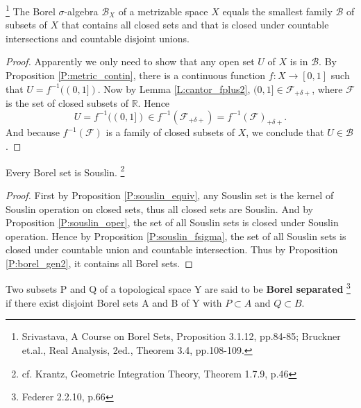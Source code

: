 \begin{proposition} \label{P:borel_gen4}
\footnote{Srivastava, A Course on Borel Sets, Proposition 3.1.12, pp.84-85;
	Bruckner et.al., Real Analysis, 2ed., Theorem 3.4, pp.108-109.}
The Borel $\sigma$-algebra $\mathcal{B}_X$ of a metrizable space $X$ equals the
smallest family $\mathcal{B}$ of subsets of $X$ that contains all closed sets and
that is closed under countable intersections and countable disjoint unions.
\end{proposition}
\begin{proof}
Apparently we only need to show that any open set $U$ of $X$ is in 
$\mathcal{B}$. By Proposition \ref{P:metric_contin}, there is a continuous
function $f:X\to [0,1]$ such that $U=f^{-1}((0,1])$. Now by Lemma
\ref{L:cantor_fplus2}, $(0,1]\in\mathcal{F}_{+\delta +}$, where $\mathcal{F}$ is
the set of closed subsets of $\mathbb{R}$. Hence
\[
  U=f^{-1}((0,1]) \in f^{-1}(\mathcal{F}_{+\delta +})
   = f^{-1}(\mathcal{F})_{+\delta +}. 
\]
And because $f^{-1}(\mathcal{F})$ is a family of closed subsets of $X$, we
conclude that $U \in \mathcal{B}$.
\end{proof}


\begin{proposition}
Every Borel set is Souslin.
  \footnote{cf. Krantz, Geometric Integration Theory, Theorem 1.7.9, p.46}
\end{proposition}
\begin{proof}
First by Proposition \ref{P:souslin_equiv}, any Souslin set is the kernel of
Souslin operation on closed sets, thus all closed sets are Souslin. And by
Proposition \ref{P:souslin_oper}, the set of all Souslin sets is closed under 
Souslin operation. Hence by Proposition \ref{P:souslin_fsigma}, the set of all
Souslin sets is closed under countable union and countable intersection. Thus by
Proposition \ref{P:borel_gen2}, it contains all Borel sets.
\end{proof}

\begin{definition}
Two subsets P and Q of a topological space Y are said to be 
\textbf{Borel separated} 
\footnote{Federer 2.2.10, p.66}
if there exist disjoint Borel sets A and B of Y with 
$P\subset A$ and $Q\subset B$.
\end{definition}

